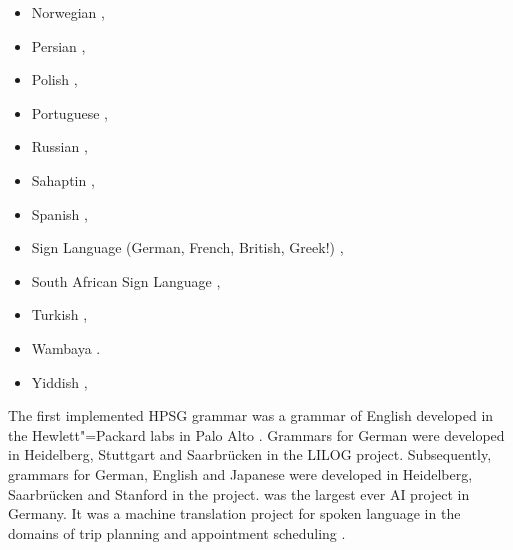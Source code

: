 \begin{itemize}
\citep*{Liu97a,%
Ng97a,%
ML2009a,ML2013a,YF2014a-u,FSB2015a-u},
\item Norwegian \citep{HH2004a-u,BH2004a-u,HB2006a-u,Haugereid2017a-u}, 
\item Persian \citep{MuellerPersian,MG2010a},
\item Polish \citep*{PKMM2002a-u,MMPK2003a-u}, %
\item Portuguese \citep{BC2008a-u,BC2008b-single-quotes,CB2010a-u},
\item Russian \citep{AZ2009a-u}, %
\item Sahaptin \citep{Drellishak2009a-u}, %
\item Spanish
  \citep*{PinedaMeza2005-u,PinedaMeza2005b-u,Bildhauer2008a,Marimon2013a-u%
}, 
\item Sign Language (German, French, British, Greek!) \citep{SM2002a-u,MS2004a-u,SG2010a-u},
\item South African Sign Language \citep{Bungeroth2002a-u},
\item Turkish \citep*{FPB09a-u},
\item Wambaya \citep{Bender2008b-u,Bender2008a,Bender2010a-u}.
\item Yiddish \citep{MOe2011a},
\end{itemize}
The first implemented HPSG grammar was a grammar of English developed in the Hewlett"=Packard labs in Palo Alto
\citep*{FPW85a,Flickinger87}. Grammars for German were developed in Heidelberg, Stuttgart and
Saarbrücken in the LILOG project. Subsequently, grammars for German, English and Japanese were
developed in Heidelberg, Saarbrücken and Stanford in the \verbmobil project. \verbmobil was the
largest ever AI project in Germany. It was a machine translation project for spoken language in the
domains of trip planning and appointment scheduling \citep{Wahlster2000a-ed-not-crossreferenced}.

